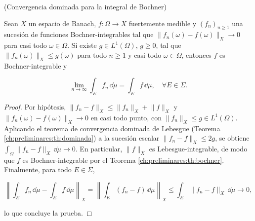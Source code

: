 \begin{Teorema}{(Convergencia dominada para la integral de Bochner)}
\label{ch:preliminares:th:bochnerDominada}

Sean $X$ un espacio de Banach, $f : \Omega \rightarrow X$ fuertemente medible y
$(f_n)_{n \geq 1}$ una sucesión de funciones Bochner-integrables tal que
$\lVert f_n(\omega) - f(\omega) \rVert_X \rightarrow 0$ para casi todo
$\omega \in \Omega$. Si existe $g \in L^1(\Omega)$, $g \geq 0$, tal que
$\lVert f_n(\omega) \rVert_X \leq g(\omega)$ para todo $n \geq 1$ y casi todo
$\omega \in \Omega$, entonces $f$ es Bochner-integrable y

\[\lim_{n \rightarrow \infty} \int_E f_n \, \dd \mu = \int_E f \, \dd \mu, \quad \forall E \in \Sigma.\]
\end{Teorema}

\begin{proof}
Por hipótesis, $\lVert f_n - f \rVert_X \leq \lVert f_n \rVert_X + \lVert f \rVert_X$
y $\lVert f_n(\omega) - f(\omega) \rVert_X \rightarrow 0$ en casi todo punto, con
$\lVert f_n \rVert_X \leq g \in L^1(\Omega)$. Aplicando el teorema de convergencia
dominada de Lebesgue (Teorema \ref{ch:preliminares:th:dominada}) a la sucesión
escalar $\lVert f_n - f \rVert_X \leq 2g$, se obtiene
$\int_\Omega \lVert f_n - f \rVert_X \, \dd \mu \rightarrow 0$. En
particular, $\lVert f \rVert_X$ es Lebesgue-integrable, de modo que $f$ es
Bochner-integrable por el Teorema \ref{ch:preliminares:th:bochner}. Finalmente,
para todo $E \in \Sigma$,

\[\left\lVert \int_E f_n \, \dd \mu - \int_E f \, \dd \mu \right\rVert_X = \left\lVert \int_E (f_n - f) \, \dd \mu \right\rVert_X \leq \int_E \lVert f_n - f \rVert_X \, \dd \mu \rightarrow 0,\]

lo que concluye la prueba.
\end{proof}